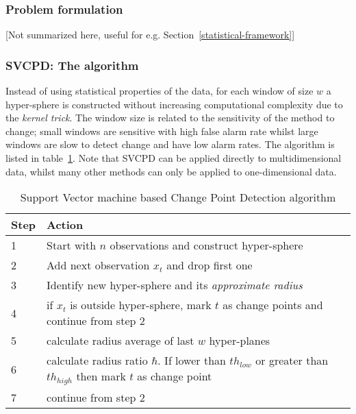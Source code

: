 \subsubsection{Problem formulation}
[Not summarized here, useful for e.g. Section~\ref{statistical-framework}]

\subsubsection{SVCPD: The algorithm}
Instead of using statistical properties of the data, for each window of size $w$ a hyper-sphere is constructed without increasing computational complexity due to the \emph{kernel trick}.
The window size is related to the sensitivity of the method to change; small windows are sensitive with high false alarm rate whilst large windows are slow to detect change and have low alarm rates.
The algorithm is listed in table~\ref{tab:alg-svcdp}.
Note that SVCPD can be applied directly to multidimensional data, whilst many other methods can only be applied to one-dimensional data.

\begin{center}\begin{table}
\begin{tabular}{ l p{12cm} }
  \hline
  Step & Action \\
  \hline
  1 & Start with $n$ observations and construct hyper-sphere \\
  2 & Add next observation $x_t$ and drop first one \\
  3 & Identify new hyper-sphere and its \emph{approximate radius} \\
  4 & if $x_t$ is outside hyper-sphere, mark $t$ as change points and continue from step 2 \\
  5 & calculate radius average of last $w$ hyper-planes \\
  6 & calculate radius ratio $\hbar$. If lower than ${th}_{low}$ or greater than ${th}_{high}$ then mark $t$ as change point \\
  7 & continue from step 2 \\
  \hline
\end{tabular}
\caption{Support Vector machine based Change Point Detection algorithm}
\label{tab:alg-svcdp}
\end{table}\end{center}





